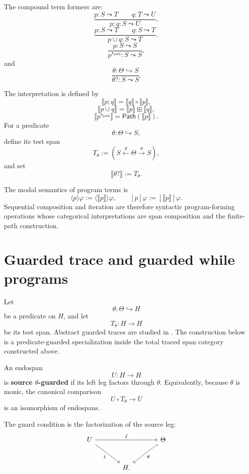 The compound term formers are:
\[
  \frac{p:S\leadsto T \qquad q:T\leadsto U}
       {p;q:S\leadsto U},
\]
\[
  \frac{p:S\leadsto T \qquad q:S\leadsto T}
       {p\cup q:S\leadsto T},
\]
\[
  \frac{p:S\leadsto S}
       {p^{\star_{\mathrm{path}}}:S\leadsto S},
\]
and
\[
  \frac{\theta:\Theta\hookrightarrow S}
       {\theta?:S\leadsto S}.
\]

The interpretation is defined by
\[
  \llbracket p;q\rrbracket
  =
  \llbracket q\rrbracket\circ\llbracket p\rrbracket,
\]
\[
  \llbracket p\cup q\rrbracket
  =
  \llbracket p\rrbracket\boxplus\llbracket q\rrbracket,
\]
\[
  \llbracket p^{\star_{\mathrm{path}}}\rrbracket
  =
  \mathsf{Path}(\llbracket p\rrbracket).
\]
For a predicate
\[
  \theta:\Theta\hookrightarrow S,
\]
define its test span
\[
  T_{\theta}:=
  \left(
    S\xleftarrow{\theta}\Theta\xrightarrow{\theta}S
  \right),
\]
and set
\[
  \llbracket\theta?\rrbracket:=T_{\theta}.
\]

The modal semantics of program terms is
\[
  \langle p\rangle\varphi
  :=
  \langle\llbracket p\rrbracket\rangle\varphi,
  \qquad
  [p]\varphi
  :=
  [\llbracket p\rrbracket]\varphi.
\]
Sequential composition and iteration are therefore syntactic program-forming
operations whose categorical interpretations are span composition and the
finite-path construction.

\section{Guarded trace and guarded while programs}
\label{sec:guarded-trace-and-while-feedback}

Let
\[
  \theta:\Theta\hookrightarrow H
\]
be a predicate on \(H\), and let
\[
  T_\theta:H\to H
\]
be its test span. Abstract guarded traces are studied in
\cite{GoncharovSchroder2018GuardedTracedCategories}. The construction below
is a predicate-guarded specialization inside the total traced span category
constructed above.

\begin{definition}
\label{def:predicate-guarded-endospan}
An endospan
\[
  U:H\to H
\]
is \textbf{source \(\theta\)-guarded} if its left leg factors through
\(\theta\). Equivalently, because \(\theta\) is monic, the canonical
comparison
\[
  U\circ T_\theta\longrightarrow U
\]
is an isomorphism of endospans.
\end{definition}

The guard condition is the factorization of the source leg:
\[
\begin{tikzcd}[column sep=large,row sep=large]
  U
    \ar[rr,"\bar\ell"]
    \ar[dr,"\ell"']
  &&
  \Theta
    \ar[dl,hook,"\theta"]
  \\
  &
  H .
\end{tikzcd}
\]

